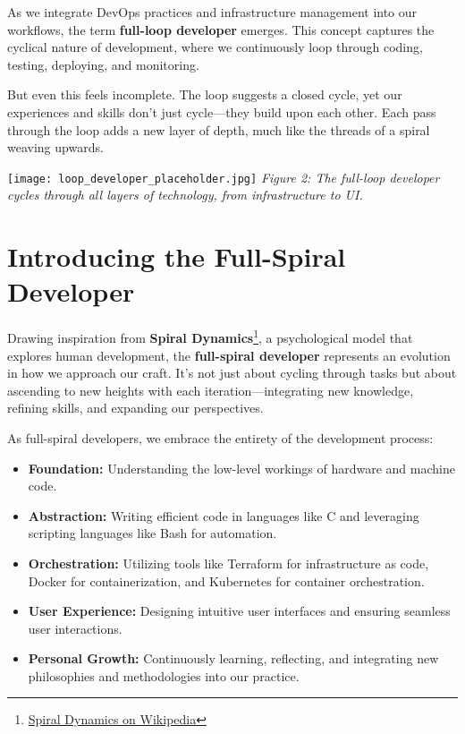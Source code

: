 \documentclass{article}
\begin{document}
As we integrate DevOps practices and infrastructure management into our workflows, the term \textbf{full-loop developer} emerges. This concept captures the cyclical nature of development, where we continuously loop through coding, testing, deploying, and monitoring.

But even this feels incomplete. The loop suggests a closed cycle, yet our experiences and skills don't just cycle—they build upon each other. Each pass through the loop adds a new layer of depth, much like the threads of a spiral weaving upwards.

\vspace{0.5cm}
\noindent\texttt{[image: loop\_developer\_placeholder.jpg]}
\newline
\textit{Figure 2: The full-loop developer cycles through all layers of technology, from infrastructure to UI.}
\vspace{0.5cm}

\section{Introducing the Full-Spiral Developer}

Drawing inspiration from \textbf{Spiral Dynamics}\footnote{\href{https://en.wikipedia.org/wiki/Spiral_Dynamics}{Spiral Dynamics on Wikipedia}}, a psychological model that explores human development, the \textbf{full-spiral developer} represents an evolution in how we approach our craft. It's not just about cycling through tasks but about ascending to new heights with each iteration—integrating new knowledge, refining skills, and expanding our perspectives.

As full-spiral developers, we embrace the entirety of the development process:

\begin{itemize}
    \item \textbf{Foundation:} Understanding the low-level workings of hardware and machine code.
    \item \textbf{Abstraction:} Writing efficient code in languages like C and leveraging scripting languages like Bash for automation.
    \item \textbf{Orchestration:} Utilizing tools like Terraform for infrastructure as code, Docker for containerization, and Kubernetes for container orchestration.
    \item \textbf{User Experience:} Designing intuitive user interfaces and ensuring seamless user interactions.
    \item \textbf{Personal Growth:} Continuously learning, reflecting, and integrating new philosophies and methodologies into our practice.
\end{itemize}
\end{document}

